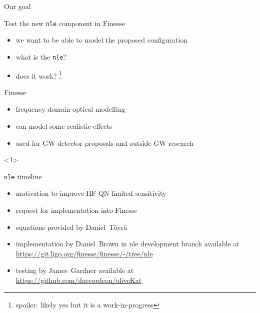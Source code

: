 \documentclass[12pt]{beamer}
\newcommand{\code}[1]{\texttt{#1}}
\begin{document}
\begin{frame}{Our goal}
\begin{block}{Test the new \code{nle} component in Finesse}
\begin{itemize}
\item we want to be able to model the proposed configuration
\item what is the \code{nle}?
\item does it work? \footnote{spoiler: likely yes but it is a work-in-progress}
\end{itemize}
\end{block}
\end{frame}

\begin{frame}{Finesse}
\begin{itemize}
\item<1> frequency domain optical modelling 
\item<1> can model some realistic effects
\item<1> used for GW detector proposals and outside GW research
\end{itemize}
\begin{figure}
    \captionsetup[subfigure]{labelformat=empty}
    \centering 
    \qquad
\end{figure}
<1>
\end{frame}

\begin{frame}{\code{nle} timeline}
\begin{itemize}
\item motivation to improve HF QN limited sensitivity
\item request for implementation into Finesse
\item equations provided by Daniel~Töyrä
\item implementation by Daniel~Brown in nle development branch available at {\color{blue}\url{https://git.ligo.org/finesse/finesse/-/tree/nle}}
\item testing by James~Gardner available at {\color{blue}\url{https://github.com/daccordeon/aliveKat}}
\end{itemize}
\end{frame}
\end{document}
